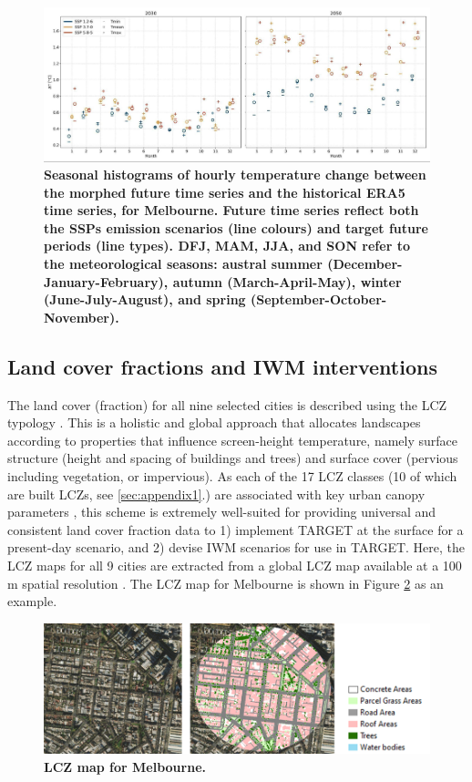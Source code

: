 \documentclass[final,3p,times,authoryear]{elsarticle}
\begin{document}
\begin{figure}
\centering
\includegraphics[trim={0 0 0 0},clip,scale=0.25]{images/image3.jpg}
\caption{\bf Seasonal histograms of hourly temperature change between the morphed future time series and the historical ERA5 time series, for Melbourne. Future time series reflect both the SSPs emission scenarios (line colours) and target future periods (line types). DFJ, MAM, JJA, and SON refer to the meteorological seasons: austral summer (December-January-February), autumn (March-April-May), winter (June-July-August), and spring (September-October-November).}
 \label{fig:MelHist}
\end{figure}

\subsection{Land cover fractions and IWM interventions}\label{sec:lc}

The land cover (fraction) for all nine selected cities is described using the LCZ typology \citep{Stewart2012b}. This is a holistic and global approach that allocates landscapes according to properties that influence screen-height temperature, namely surface structure (height and spacing of buildings and trees) and surface cover (pervious including vegetation, or impervious). As each of the 17 LCZ classes (10 of which are built LCZs, see \ref{sec:appendix1}.) are associated with key urban canopy parameters \citep{Ching2018a}, this scheme is extremely well-suited for providing universal and consistent land cover fraction data to 1) implement TARGET at the surface for a present-day scenario, and 2) devise IWM scenarios for use in TARGET. Here, the LCZ maps for all 9 cities are extracted from a global LCZ map available at a 100 m spatial resolution \citep{Demuzere2022}. The LCZ map for Melbourne is shown in Figure \ref{fig:MelLCZ} as an example.

\begin{figure}
\centering
\includegraphics[trim={0 0 0 0},clip,scale=0.35]{images/image4.png}
\caption{\bf LCZ map for Melbourne.}
 \label{fig:MelLCZ}
\end{figure}
\end{document}

